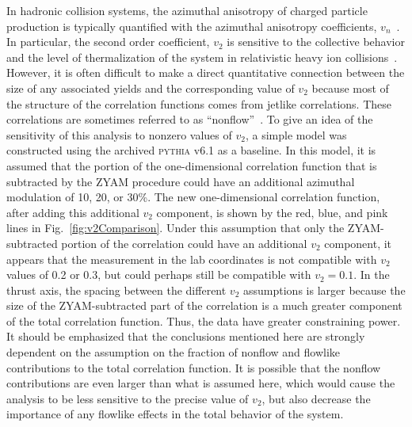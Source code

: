 \documentclass[aps,prl,twocolumn,superscriptaddress,groupedaddress]{revtex4}  %
\begin{document}

In hadronic collision systems, the azimuthal anisotropy of charged particle production is typically quantified with the azimuthal anisotropy coefficients, $v_{n}$~\cite{Voloshin:1994mz,Poskanzer:1998yz,Alver:2010gr}.  In particular, the second order coefficient, $v_{2}$ is sensitive to the collective behavior and the level of thermalization of the system in relativistic heavy ion collisions~\cite{Ollitrault:1992bk,Ackermann:2000tr}. However, it is often difficult to make a direct quantitative connection between the size of any associated yields and the corresponding value of $v_{2}$ because most of the structure of the correlation functions comes from jetlike correlations.  These correlations are sometimes referred to as ``nonflow''~\cite{Adler:2002tq,Adare:2008ae,Aamodt:2010pa,Sirunyan:2017pan}.  To give an idea of the sensitivity of this analysis to nonzero values of $v_{2}$, a simple model was constructed using the archived \textsc{pythia} v6.1 as a baseline.  In this model, it is assumed that the portion of the one-dimensional correlation function that is subtracted by the ZYAM procedure could have an additional azimuthal modulation of 10, 20, or 30\%.  The new one-dimensional correlation function, after adding this additional $v_{2}$ component, is shown by the red, blue, and pink lines in Fig.~\ref{fig:v2Comparison}. Under this assumption that only the ZYAM-subtracted portion of the correlation could have an additional $v_{2}$ component, it appears that the measurement in the lab coordinates is not compatible with $v_{2}$ values of 0.2 or 0.3, but could perhaps still be compatible with $v_{2}=0.1$.  In the thrust axis, the spacing between the different $v_{2}$ assumptions is larger because the size of the ZYAM-subtracted part of the correlation is a much greater component of the total correlation function. Thus, the data have greater constraining power.  It should be emphasized that the conclusions mentioned here are strongly dependent on the assumption on the fraction of nonflow and flowlike contributions to the total correlation function.  It is possible that the nonflow contributions are even larger than what is assumed here, which would cause the analysis to be less sensitive to the precise value of $v_{2}$, but also decrease the importance of any flowlike effects in the total behavior of the system.  
\end{document}
